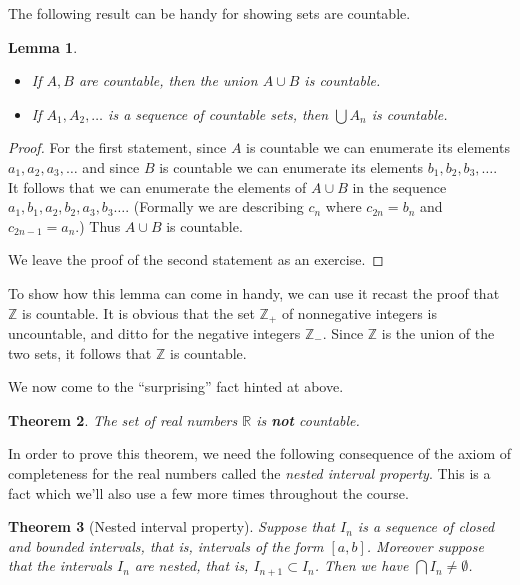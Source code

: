 \documentclass[11pt,oneside]{amsbook}
\newcommand{\Z}{\mathbb Z}
\newcommand{\R}{\mathbb R}
\theoremstyle{definition}
\theoremstyle{plain}
\newtheorem{theorem}{Theorem}[section]
\newtheorem{lemma}[theorem]{Lemma}
\theoremstyle{definition}
\theoremstyle{remark}
\numberwithin{equation}{section}
\numberwithin{figure}{section}
\begin{document}
The following result can be handy for showing sets are countable.

\begin{lemma}
  \begin{itemize}
  \item If $A,B$ are countable, then the union $A\cup B$ is countable.
  \item If $A_1,A_2,\ldots$ is a sequence of countable sets, then $\bigcup A_n$ is countable.
  \end{itemize}
\end{lemma}

\begin{proof}
  For the first statement, since $A$ is countable we can enumerate its elements $a_1,a_2,a_3,\ldots$ and since $B$ is countable we can enumerate its elements $b_1,b_2,b_3,\ldots$. It follows that we can enumerate the elements of $A\cup B$ in the sequence $a_1,b_1,a_2,b_2,a_3,b_3\ldots$. (Formally we are describing $c_n$ where $c_{2n}=b_n$ and $c_{2n-1}=a_n$.) Thus $A\cup B$ is countable.

  We leave the proof of the second statement as an exercise.
\end{proof}

To show how this lemma can come in handy, we can use it recast the proof that $\Z$ is countable. It is obvious that the set $\Z_+$ of nonnegative integers is uncountable, and ditto for the negative integers $\Z_-$. Since $\Z$ is the union of the two sets, it follows that $\Z$ is countable.

We now come to the ``surprising'' fact hinted at above.

\begin{theorem}
  \label{thm:reals-uncountable}
  The set of real numbers $\R$ is \textbf{not} countable.
\end{theorem}

In order to prove this theorem, we need the following consequence of the axiom of completeness for the real numbers called the \emph{nested interval property}. This is a fact which we'll also use a few more times throughout the course.

\begin{theorem}[Nested interval property]
  Suppose that $I_n$ is a sequence of closed and bounded intervals, that is, intervals of the form $[a,b]$. Moreover suppose that the intervals $I_n$ are nested, that is, $I_{n+1}\subset I_n$. Then we have $\bigcap I_n\neq\emptyset$.
\end{theorem}
\end{document}
